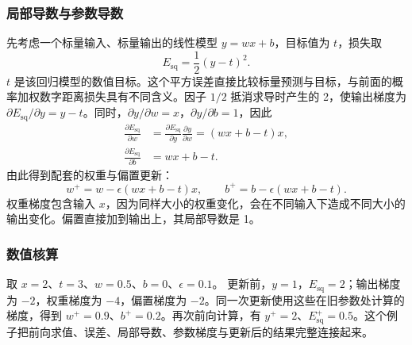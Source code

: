 \subsubsection{局部导数与参数导数}
先考虑一个标量输入、标量输出的线性模型 $y=wx+b$，目标值为 $t$，损失取
\begin{equation}
 E_{\mathrm{sq}}=\frac12(y-t)^2.
 \label{l10:eq:scalar-loss}
\end{equation}
$t$ 是该回归模型的数值目标。这个平方误差直接比较标量预测与目标，与前面的概率加权数字距离损失具有不同含义。因子 $1/2$ 抵消求导时产生的 2，使输出梯度为 $\partial E_{\mathrm{sq}}/\partial y=y-t$。同时，$\partial y/\partial w=x$，$\partial y/\partial b=1$，因此
\begin{align}
 \frac{\partial E_{\mathrm{sq}}}{\partial w}
 &=\frac{\partial E_{\mathrm{sq}}}{\partial y}\frac{\partial y}{\partial w}
 =(wx+b-t)x,\\
 \frac{\partial E_{\mathrm{sq}}}{\partial b}&=wx+b-t.
\end{align}
由此得到配套的权重与偏置更新：
\begin{equation}
 w^{+}=w-\epsilon(wx+b-t)x,\qquad
 b^{+}=b-\epsilon(wx+b-t).
 \label{l10:eq:scalar-update}
\end{equation}
权重梯度包含输入 $x$，因为同样大小的权重变化，会在不同输入下造成不同大小的输出变化。偏置直接加到输出上，其局部导数是 1。

\subsubsection{数值核算}
取 $x=2$、$t=3$、$w=0.5$、$b=0$、$\epsilon=0.1$。
更新前，$y=1$，$E_{\mathrm{sq}}=2$；输出梯度为 $-2$，权重梯度为 $-4$，偏置梯度为 $-2$。同一次更新使用这些在旧参数处计算的梯度，得到 $w^+=0.9$、$b^+=0.2$。再次前向计算，有 $y^+=2$、$E_{\mathrm{sq}}^+=0.5$。这个例子把前向求值、误差、局部导数、参数梯度与更新后的结果完整连接起来。
